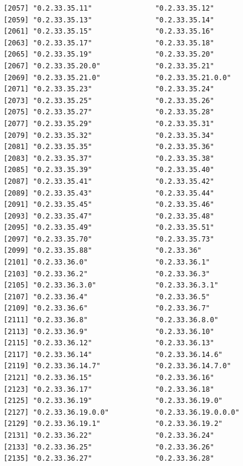 \documentclass[
  letterpaper,
  DIV=11,
  numbers=noendperiod]{scrreprt}
\begin{document}
\begin{verbatim}
[2057] "0.2.33.35.11"               "0.2.33.35.12"              
[2059] "0.2.33.35.13"               "0.2.33.35.14"              
[2061] "0.2.33.35.15"               "0.2.33.35.16"              
[2063] "0.2.33.35.17"               "0.2.33.35.18"              
[2065] "0.2.33.35.19"               "0.2.33.35.20"              
[2067] "0.2.33.35.20.0"             "0.2.33.35.21"              
[2069] "0.2.33.35.21.0"             "0.2.33.35.21.0.0"          
[2071] "0.2.33.35.23"               "0.2.33.35.24"              
[2073] "0.2.33.35.25"               "0.2.33.35.26"              
[2075] "0.2.33.35.27"               "0.2.33.35.28"              
[2077] "0.2.33.35.29"               "0.2.33.35.31"              
[2079] "0.2.33.35.32"               "0.2.33.35.34"              
[2081] "0.2.33.35.35"               "0.2.33.35.36"              
[2083] "0.2.33.35.37"               "0.2.33.35.38"              
[2085] "0.2.33.35.39"               "0.2.33.35.40"              
[2087] "0.2.33.35.41"               "0.2.33.35.42"              
[2089] "0.2.33.35.43"               "0.2.33.35.44"              
[2091] "0.2.33.35.45"               "0.2.33.35.46"              
[2093] "0.2.33.35.47"               "0.2.33.35.48"              
[2095] "0.2.33.35.49"               "0.2.33.35.51"              
[2097] "0.2.33.35.70"               "0.2.33.35.73"              
[2099] "0.2.33.35.88"               "0.2.33.36"                 
[2101] "0.2.33.36.0"                "0.2.33.36.1"               
[2103] "0.2.33.36.2"                "0.2.33.36.3"               
[2105] "0.2.33.36.3.0"              "0.2.33.36.3.1"             
[2107] "0.2.33.36.4"                "0.2.33.36.5"               
[2109] "0.2.33.36.6"                "0.2.33.36.7"               
[2111] "0.2.33.36.8"                "0.2.33.36.8.0"             
[2113] "0.2.33.36.9"                "0.2.33.36.10"              
[2115] "0.2.33.36.12"               "0.2.33.36.13"              
[2117] "0.2.33.36.14"               "0.2.33.36.14.6"            
[2119] "0.2.33.36.14.7"             "0.2.33.36.14.7.0"          
[2121] "0.2.33.36.15"               "0.2.33.36.16"              
[2123] "0.2.33.36.17"               "0.2.33.36.18"              
[2125] "0.2.33.36.19"               "0.2.33.36.19.0"            
[2127] "0.2.33.36.19.0.0"           "0.2.33.36.19.0.0.0"        
[2129] "0.2.33.36.19.1"             "0.2.33.36.19.2"            
[2131] "0.2.33.36.22"               "0.2.33.36.24"              
[2133] "0.2.33.36.25"               "0.2.33.36.26"              
[2135] "0.2.33.36.27"               "0.2.33.36.28"              

\end{verbatim}
\end{document}
